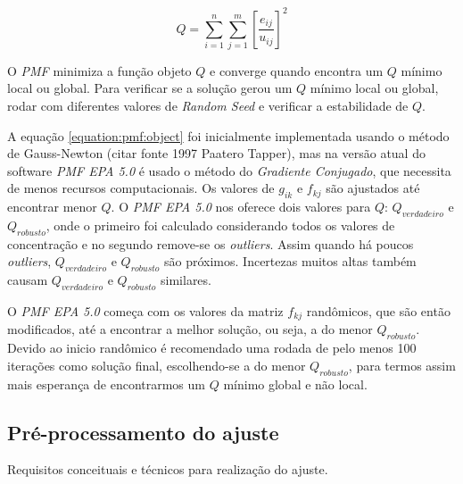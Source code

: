 \begin{equation}
  Q = \sum_{i=1}^n \sum_{j=1}^m  \left[ \frac{e_{ij}} {u_{ij}} \right] ^2
  \label{equation:pmf:object}
\end{equation}

O \textit{PMF} minimiza a função objeto $Q$ e converge quando encontra um $Q$ mínimo local ou global. 
Para verificar se a solução gerou um $Q$ mínimo local ou global, rodar com diferentes valores de \textit{Random Seed} e verificar a estabilidade de $Q$.

A equação \ref{equation:pmf:object} foi inicialmente implementada usando o método de Gauss-Newton  (citar fonte 1997 Paatero Tapper), mas na versão atual do software \textit{PMF EPA 5.0} é usado o método do \textit{Gradiente Conjugado}, que necessita de menos recursos computacionais. 
Os valores de $g_{ik}$ e $f_{kj}$ são ajustados até encontrar menor $Q$. O \textit{PMF EPA 5.0} nos oferece dois valores para $Q$: $Q_{verdadeiro}$ e $Q_{robusto}$, onde o primeiro foi calculado considerando todos os valores de concentração e no segundo remove-se os \textit{outliers}. Assim quando há poucos \textit{outliers}, $Q_{verdadeiro}$ e $Q_{robusto}$ são próximos. Incertezas muitos altas também causam $Q_{verdadeiro}$ e $Q_{robusto}$ similares.

O \textit{PMF EPA 5.0} começa com os valores da matriz $f_{kj}$ randômicos, que são então modificados, até a encontrar a melhor solução, ou seja, a do menor $Q_{robusto}$. Devido ao inicio randômico é recomendado uma rodada de pelo menos 100 iterações como solução final, escolhendo-se a do menor $Q_{robusto}$, para termos assim mais esperança de encontrarmos um $Q$ mínimo global e não local.

\subsection{Pré-processamento do ajuste}
Requisitos conceituais e técnicos para realização do ajuste.

